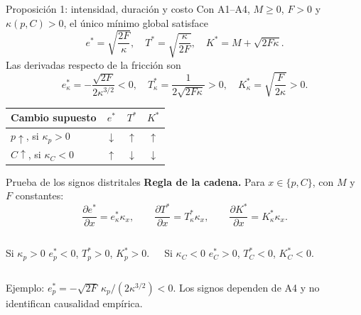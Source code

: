\documentclass[aspectratio=169,11pt]{beamer}
\newcommand{\nota}[1]{\par\vfill{\footnotesize\color{blue}#1}}
\begin{document}
\begin{frame}{Proposición 1: intensidad, duración y costo}
Con A1--A4, $M\ge0$, $F>0$ y $\kappa(p,C)>0$, el único mínimo global satisface
\[
\boxed{e^*=\sqrt{\frac{2F}{\kappa}},\quad
T^*=\sqrt{\frac{\kappa}{2F}},\quad
K^*=M+\sqrt{2F\kappa}.}
\]
Las derivadas respecto de la fricción son
\[
e^*_{\kappa}=-\frac{\sqrt{2F}}{2\kappa^{3/2}}<0,\quad
T^*_{\kappa}=\frac{1}{2\sqrt{2F\kappa}}>0,\quad
K^*_{\kappa}=\sqrt{\frac{F}{2\kappa}}>0.
\]
\begin{center}
\begin{tabular}{lccc}\toprule
Cambio supuesto & $e^*$ & $T^*$ & $K^*$ \\\midrule
$p\uparrow$, si $\kappa_p>0$ & $\downarrow$ & $\uparrow$ & $\uparrow$ \\
$C\uparrow$, si $\kappa_C<0$ & $\uparrow$ & $\downarrow$ & $\downarrow$ \\\bottomrule
\end{tabular}
\end{center}
\end{frame}

\begin{frame}{Prueba de los signos distritales}
\textbf{Regla de la cadena.} Para $x\in\{p,C\}$, con $M$ y $F$ constantes:
\[
\frac{\partial e^*}{\partial x}=e^*_{\kappa}\kappa_x,\qquad
\frac{\partial T^*}{\partial x}=T^*_{\kappa}\kappa_x,\qquad
\frac{\partial K^*}{\partial x}=K^*_{\kappa}\kappa_x.
\]
\begin{columns}[T]
\begin{block}{Si $\kappa_p>0$}
$e_p^*<0$, $T_p^*>0$, $K_p^*>0$.
\end{block}
\begin{block}{Si $\kappa_C<0$}
$e_C^*>0$, $T_C^*<0$, $K_C^*<0$.
\end{block}
\end{columns}
\nota{Ejemplo: $e_p^*=-\sqrt{2F}\,\kappa_p/(2\kappa^{3/2})<0$. Los signos dependen de A4 y no identifican causalidad empírica.}
\end{frame}
\end{document}
